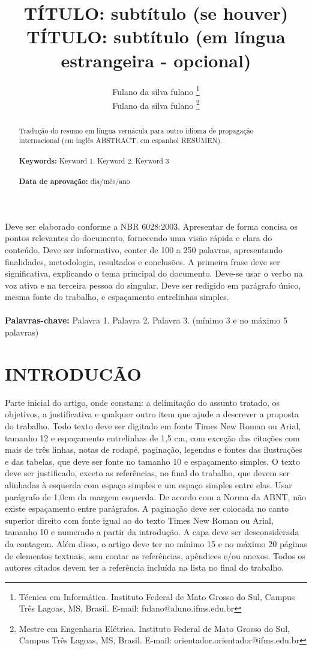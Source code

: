 \documentclass[12pt]{article}
\title{TÍTULO: subtítulo (se houver)\\ TÍTULO: subtítulo (em língua estrangeira - opcional)}
\author{ Fulano da silva fulano \thanks{Técnica em Informática. Instituto Federal de Mato Grosso do Sul, Campus Três Lagoas, MS, Brasil. E-mail: fulano@aluno.ifms.edu.br}  \\ {Fulano da silva fulano \thanks{Mestre em Engenharia Elétrica. Instituto Federal de Mato Grosso do Sul, Campus Três Lagoas, MS, Brasil. E-mail: orientador.orientador@ifms.edu.br}}}
\begin{document}
 

\maketitle

\begin {resumo} %
  Deve ser elaborado conforme a NBR 6028:2003. Apresentar de forma concisa os pontos relevantes do documento, fornecendo uma visão rápida e clara do conteúdo. Deve ser informativo, conter de 100 a 250 palavras, apresentando finalidades, metodologia, resultados e conclusões. A primeira frase deve ser significativa, explicando o tema principal do documento. Deve-se usar o verbo na voz ativa e na terceira pessoa do singular. Deve ser redigido em parágrafo único, mesma fonte do trabalho, e espaçamento entrelinhas simples. \\ \\ \textbf{Palavras-chave:} Palavra 1. Palavra 2. Palavra 3. (mínimo 3 e no máximo 5 palavras)
\end{resumo} 

\begin{abstract}
  Tradução do resumo em língua vernácula para outro idioma de propagação internacional (em inglês ABSTRACT, em espanhol RESUMEN).\\ \\ \textbf{Keywords:} Keyword 1. Keyword 2. Keyword 3 \\ \\ \textbf{Data de aprovação:} dia/mês/ano
\end{abstract}

\onehalfspacing

\section{INTRODUCÃO} 

Parte inicial do artigo, onde constam: a delimitação do assunto tratado, os objetivos, a justificativa e qualquer outro item que ajude a descrever a proposta do trabalho. 
Todo texto deve ser digitado em fonte Times New Roman ou Arial, tamanho 12 e espaçamento entrelinhas de 1,5 cm, com exceção das citações com mais de três linhas, notas de rodapé, paginação, legendas e fontes das ilustrações e das tabelas, que deve ser fonte no tamanho 10 e espaçamento simples. 
O texto deve ser justificado, exceto as referências, no final do trabalho, que devem ser alinhadas à esquerda com espaço simples e um espaço simples entre elas. 
Usar parágrafo de 1,0cm da margem esquerda. De acordo com a Norma da ABNT, não existe espaçamento entre parágrafos.
A paginação deve ser colocada no canto superior direito com fonte igual ao do texto Times New Roman ou Arial, tamanho 10 e numerado a partir da introdução. A capa deve ser desconsiderada da contagem. Além disso, o artigo deve ter no mínimo 15 e no máximo 20 páginas de elementos textuais, sem contar as referências, apêndices e/ou anexos.
Todos os autores citados devem ter a referência incluída na lista no final do trabalho.
\end{document}

